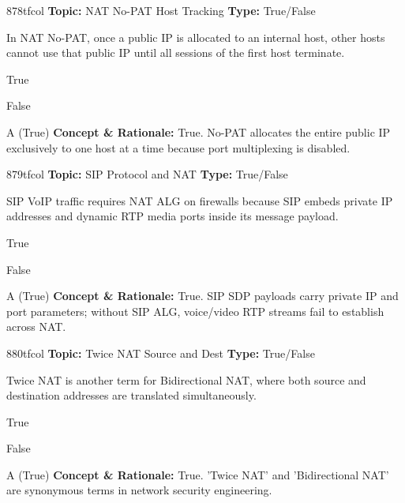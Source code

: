 \begin{qcard}{878}{tfcol}
\textcolor{darkslate!75}{\small\textbf{Topic:} NAT No-PAT Host Tracking \hfill \textbf{Type:} True/False}\vspace{0.4em}\par
In NAT No-PAT, once a public IP is allocated to an internal host, other hosts cannot use that public IP until all sessions of the first host terminate.
\begin{qoptions}
\item True
\item False
\end{qoptions}
\end{qcard}
\nopagebreak
\begin{explainbox}{A (True)}
\textbf{Concept \& Rationale:} True. No-PAT allocates the entire public IP exclusively to one host at a time because port multiplexing is disabled.
\end{explainbox}

\begin{qcard}{879}{tfcol}
\textcolor{darkslate!75}{\small\textbf{Topic:} SIP Protocol and NAT \hfill \textbf{Type:} True/False}\vspace{0.4em}\par
SIP VoIP traffic requires NAT ALG on firewalls because SIP embeds private IP addresses and dynamic RTP media ports inside its message payload.
\begin{qoptions}
\item True
\item False
\end{qoptions}
\end{qcard}
\nopagebreak
\begin{explainbox}{A (True)}
\textbf{Concept \& Rationale:} True. SIP SDP payloads carry private IP and port parameters; without SIP ALG, voice/video RTP streams fail to establish across NAT.
\end{explainbox}

\begin{qcard}{880}{tfcol}
\textcolor{darkslate!75}{\small\textbf{Topic:} Twice NAT Source and Dest \hfill \textbf{Type:} True/False}\vspace{0.4em}\par
Twice NAT is another term for Bidirectional NAT, where both source and destination addresses are translated simultaneously.
\begin{qoptions}
\item True
\item False
\end{qoptions}
\end{qcard}
\nopagebreak
\begin{explainbox}{A (True)}
\textbf{Concept \& Rationale:} True. 'Twice NAT' and 'Bidirectional NAT' are synonymous terms in network security engineering.
\end{explainbox}

